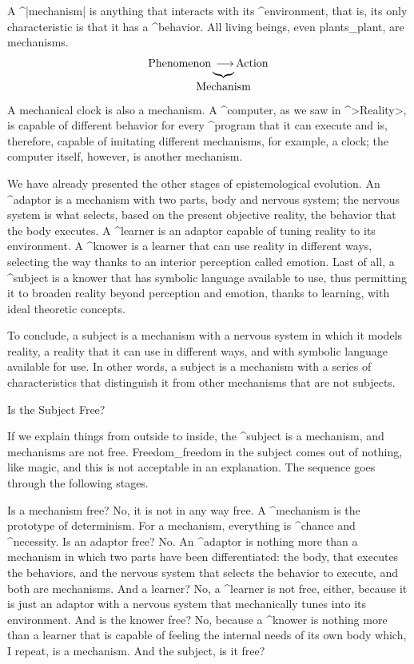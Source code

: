 A ^|mechanism| is anything that interacts with its ^{environment}, that
is, its only characteristic is that it has a ^{behavior}. All living
beings, even plants_{plant}, are mechanisms.
$$\hbox{\strut Phenomenon}
  \underbrace{\strut \longrightarrow}_{\hidewidth
   \hbox{\strut Mechanism}\hidewidth}
  \hbox{\strut Action}
\abovedisplayskip=9pt plus 3pt
\belowdisplayskip=9pt plus 3pt
$$
A mechanical clock is also a mechanism. A ^{computer}, as we saw in
^>Reality>, is capable of different behavior for every ^{program} that
it can execute and is, therefore, capable of imitating different
mechanisms, for example, a clock;  the computer itself, however, is
another mechanism.

We have already presented the other stages of epistemological evolution.
An ^{adaptor} is a mechanism with two parts, body and nervous system;
the nervous system is what selects, based on the present objective
reality, the behavior that the body executes. A ^{learner} is an adaptor
capable of tuning reality to its environment. A ^{knower} is a learner
that can use reality in different ways, selecting the way thanks to an
interior perception called emotion. Last of all, a ^{subject} is a
knower that has symbolic language available to use, thus permitting it
to broaden reality beyond perception and emotion, thanks to learning,
with ideal theoretic concepts.

To conclude, a subject is a mechanism with a nervous system in which it
models reality, a reality that it can use in different ways, and with
symbolic language available for use. In other words, a subject is a
mechanism with a series of characteristics that distinguish it from
other mechanisms that are not subjects.


\Section Is the Subject Free?

If we explain things from outside to inside, the ^{subject} is a
mechanism, and mechanisms are not free. Freedom_{freedom} in the subject
comes out of nothing, like magic, and this is not acceptable in an
explanation. The sequence goes through the following stages.

Is a mechanism free? No, it is not in any way free. A ^{mechanism} is
the prototype of determinism. For a mechanism, everything is ^{chance}
and ^{necessity}. Is an adaptor free? No. An ^{adaptor} is nothing more
than a mechanism in which two parts have been differentiated: the body,
that executes the behaviors, and the nervous system that selects the
behavior to execute, and both are mechanisms. And a learner? No, a
^{learner} is not free, either, because it is just an adaptor with a
nervous system that mechanically tunes into its environment. And is the
knower free? No, because a ^{knower} is nothing more than a learner that
is capable of feeling the internal needs of its own body which, I
repeat, is a mechanism. And the subject, is it free?

